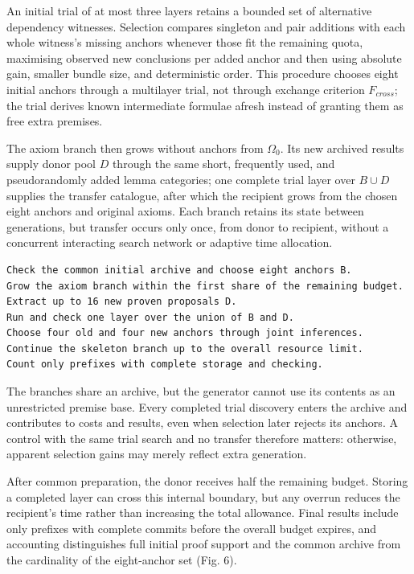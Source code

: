 \documentclass[pdflatex,sn-basic,Numbered]{sn-jnl}
\begin{document}
An initial trial of at most three layers retains a bounded set of alternative dependency witnesses. Selection compares singleton and pair additions with each whole witness's missing anchors whenever those fit the remaining quota, maximising observed new conclusions per added anchor and then using absolute gain, smaller bundle size, and deterministic order. This procedure chooses eight initial anchors through a multilayer trial, not through exchange criterion \(F_{cross}\); the trial derives known intermediate formulae afresh instead of granting them as free extra premises.

The axiom branch then grows without anchors from \(\Omega_{0}\). Its new archived results supply donor pool \(D\) through the same short, frequently used, and pseudorandomly added lemma categories; one complete trial layer over \(B \cup D\) supplies the transfer catalogue, after which the recipient grows from the chosen eight anchors and original axioms. Each branch retains its state between generations, but transfer occurs only once, from donor to recipient, without a concurrent interacting search network or adaptive time allocation.

\begin{verbatim}
Check the common initial archive and choose eight anchors B.
Grow the axiom branch within the first share of the remaining budget.
Extract up to 16 new proven proposals D.
Run and check one layer over the union of B and D.
Choose four old and four new anchors through joint inferences.
Continue the skeleton branch up to the overall resource limit.
Count only prefixes with complete storage and checking.
\end{verbatim}

The branches share an archive, but the generator cannot use its contents as an unrestricted premise base. Every completed trial discovery enters the archive and contributes to costs and results, even when selection later rejects its anchors. A control with the same trial search and no transfer therefore matters: otherwise, apparent selection gains may merely reflect extra generation.

After common preparation, the donor receives half the remaining budget. Storing a completed layer can cross this internal boundary, but any overrun reduces the recipient's time rather than increasing the total allowance. Final results include only prefixes with complete commits before the overall budget expires, and accounting distinguishes full initial proof support and the common archive from the cardinality of the eight-anchor set (Fig. 6).
\end{document}

